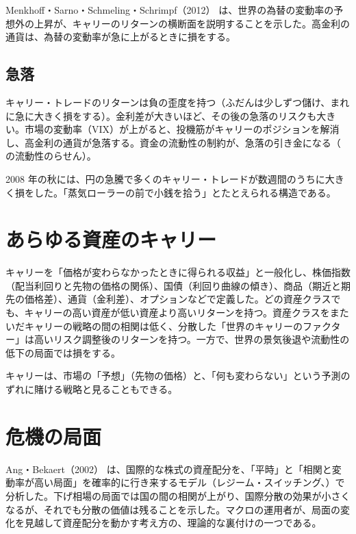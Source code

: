 Menkhoff・Sarno・Schmeling・Schrimpf（2012）\cite{msss2012} は、世界の為替の変動率の予想外の上昇が、キャリーのリターンの横断面を説明することを示した。高金利の通貨は、為替の変動率が急に上がるときに損をする。

\subsection{急落}

\begin{paperbox}
キャリー・トレードのリターンは負の歪度を持つ（ふだんは少しずつ儲け、まれに急に大きく損をする）。金利差が大きいほど、その後の急落のリスクも大きい。市場の変動率（VIX）が上がると、投機筋がキャリーのポジションを解消し、高金利の通貨が急落する。資金の流動性の制約が、急落の引き金になる（ の流動性のらせん）。
\end{paperbox}

2008 年の秋には、円の急騰で多くのキャリー・トレードが数週間のうちに大きく損をした。「蒸気ローラーの前で小銭を拾う」とたとえられる構造である。

\section{あらゆる資産のキャリー}

\begin{paperbox}
キャリーを「価格が変わらなかったときに得られる収益」と一般化し、株価指数（配当利回りと先物の価格の関係）、国債（利回り曲線の傾き）、商品（期近と期先の価格差）、通貨（金利差）、オプションなどで定義した。どの資産クラスでも、キャリーの高い資産が低い資産より高いリターンを持つ。資産クラスをまたいだキャリーの戦略の間の相関は低く、分散した「世界のキャリーのファクター」は高いリスク調整後のリターンを持つ。一方で、世界の景気後退や流動性の低下の局面では損をする。
\end{paperbox}

キャリーは、市場の「予想」（先物の価格）と、「何も変わらない」という予測のずれに賭ける戦略と見ることもできる。

\section{危機の局面}

Ang・Bekaert（2002）\cite{angbekaert2002} は、国際的な株式の資産配分を、「平時」と「相関と変動率が高い局面」を確率的に行き来するモデル（レジーム・スイッチング、）で分析した。下げ相場の局面では国の間の相関が上がり、国際分散の効果が小さくなるが、それでも分散の価値は残ることを示した。マクロの運用者が、局面の変化を見越して資産配分を動かす考え方の、理論的な裏付けの一つである。

